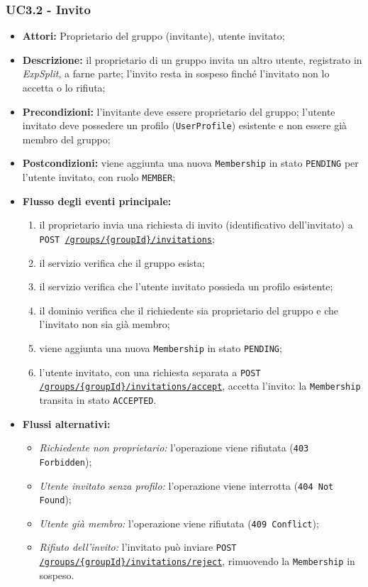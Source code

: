 \subsubsection{UC3.2 - Invito}
\begin{itemize}
    \item \textbf{Attori:} Proprietario del gruppo (invitante), utente invitato;
    \item \textbf{Descrizione:} il proprietario di un gruppo invita un altro utente, registrato in \emph{ExpSplit}, a farne parte; l'invito resta in sospeso finché l'invitato non lo accetta o lo rifiuta;
    \item \textbf{Precondizioni:} l'invitante deve essere proprietario del gruppo; l'utente invitato deve possedere un profilo (\texttt{UserProfile}) esistente e non essere già membro del gruppo;
    \item \textbf{Postcondizioni:} viene aggiunta una nuova \texttt{Membership} in stato \texttt{PENDING} per l'utente invitato, con ruolo \texttt{MEMBER};
    \item \textbf{Flusso degli eventi principale:}
    \begin{enumerate}
        \item il proprietario invia una richiesta di invito (identificativo dell'invitato) a \texttt{POST \url{/groups/{groupId}/invitations}};
        \item il servizio verifica che il gruppo esista;
        \item il servizio verifica che l'utente invitato possieda un profilo esistente;
        \item il dominio verifica che il richiedente sia proprietario del gruppo e che l'invitato non sia già membro;
        \item viene aggiunta una nuova \texttt{Membership} in stato \texttt{PENDING};
        \item l'utente invitato, con una richiesta separata a \texttt{POST \url{/groups/{groupId}/invitations/accept}}, accetta l'invito: la \texttt{Membership} transita in stato \texttt{ACCEPTED}.
    \end{enumerate}
    \item \textbf{Flussi alternativi:}
    \begin{itemize}
        \item \emph{Richiedente non proprietario:} l'operazione viene rifiutata (\texttt{403 Forbidden});
        \item \emph{Utente invitato senza profilo:} l'operazione viene interrotta (\texttt{404 Not Found});
        \item \emph{Utente già membro:} l'operazione viene rifiutata (\texttt{409 Conflict});
        \item \emph{Rifiuto dell'invito:} l'invitato può inviare \texttt{POST \url{/groups/{groupId}/invitations/reject}}, rimuovendo la \texttt{Membership} in sospeso.
    \end{itemize}
\end{itemize}

